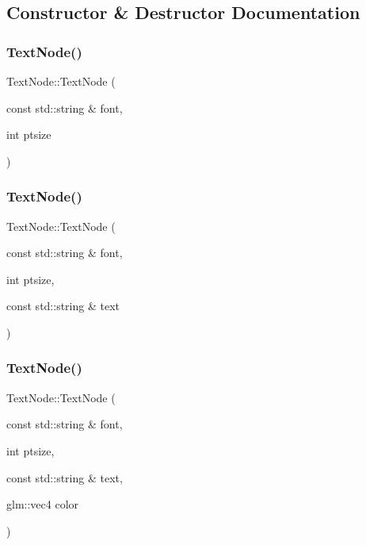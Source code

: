 \subsection{Constructor \& Destructor Documentation}
\mbox{\label{classsage_1_1TextNode_a5fbde25db3407b5e5e84ef297821dec6}} 
\subsubsection{\texorpdfstring{TextNode()}{TextNode()}\hspace{0.1cm}{\footnotesize\ttfamily [1/3]}}
{\footnotesize\ttfamily Text\+Node\+::\+Text\+Node (\begin{DoxyParamCaption}\item[{const std\+::string \&}]{font,  }\item[{int}]{ptsize }\end{DoxyParamCaption})}

\mbox{\label{classsage_1_1TextNode_a9988fa03958e378b3fd612ea3a103649}} 
\subsubsection{\texorpdfstring{TextNode()}{TextNode()}\hspace{0.1cm}{\footnotesize\ttfamily [2/3]}}
{\footnotesize\ttfamily Text\+Node\+::\+Text\+Node (\begin{DoxyParamCaption}\item[{const std\+::string \&}]{font,  }\item[{int}]{ptsize,  }\item[{const std\+::string \&}]{text }\end{DoxyParamCaption})}

\mbox{\label{classsage_1_1TextNode_ae437d57affeda55372f70607bc1c1ebf}} 
\subsubsection{\texorpdfstring{TextNode()}{TextNode()}\hspace{0.1cm}{\footnotesize\ttfamily [3/3]}}
{\footnotesize\ttfamily Text\+Node\+::\+Text\+Node (\begin{DoxyParamCaption}\item[{const std\+::string \&}]{font,  }\item[{int}]{ptsize,  }\item[{const std\+::string \&}]{text,  }\item[{glm\+::vec4}]{color }\end{DoxyParamCaption})}

